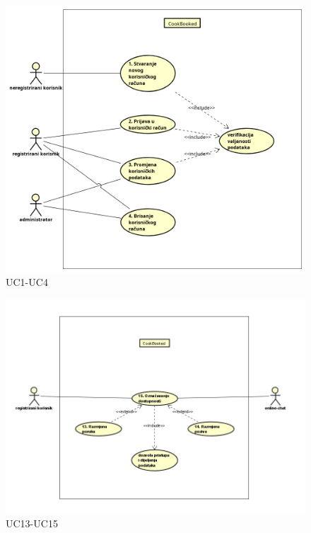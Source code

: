 					\begin{figure}[H]
						\centering
						\includegraphics[width=1.2\linewidth]{"slike/dijagrami/UML 1-4"}
						\caption{UC1-UC4}
						\label{fig:uml-1-4}
					\end{figure}
				
					\begin{figure}[H]
						\centering
						\includegraphics[width=1.2\linewidth]{"slike/dijagrami/UML 13-15"}
						\caption{UC13-UC15}
						\label{fig:uml-13-15}
					\end{figure}
		
				
				\eject		
				
